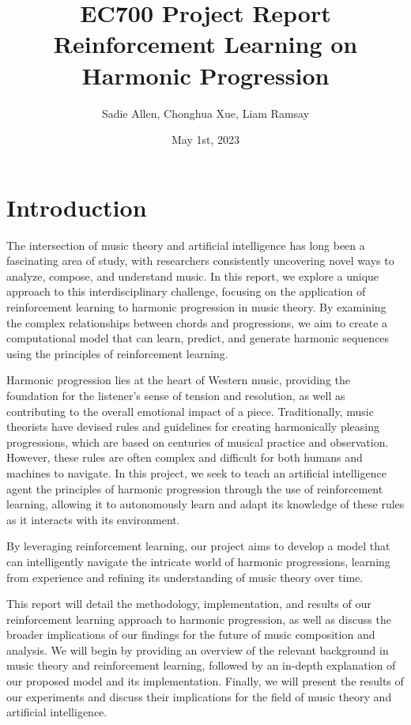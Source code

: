 \documentclass[12pt, letterpaper]{article}
\title{
    EC700 Project Report \\
    Reinforcement Learning on Harmonic Progression
}
\author{Sadie Allen, Chonghua Xue, Liam Ramsay}
\date{May 1st, 2023}
\begin{document}
\maketitle
\newpage

\section{Introduction}

The intersection of music theory and artificial intelligence has long been a fascinating area of study, with researchers consistently uncovering novel ways to analyze, compose, and understand music. In this report, we explore a unique approach to this interdisciplinary challenge, focusing on the application of reinforcement learning to harmonic progression in music theory. By examining the complex relationships between chords and progressions, we aim to create a computational model that can learn, predict, and generate harmonic sequences using the principles of reinforcement learning.

Harmonic progression lies at the heart of Western music, providing the foundation for the listener's sense of tension and resolution, as well as contributing to the overall emotional impact of a piece. Traditionally, music theorists have devised rules and guidelines for creating harmonically pleasing progressions, which are based on centuries of musical practice and observation. However, these rules are often complex and difficult for both humans and machines to navigate. In this project, we seek to teach an artificial intelligence agent the principles of harmonic progression through the use of reinforcement learning, allowing it to autonomously learn and adapt its knowledge of these rules as it interacts with its environment.

By leveraging reinforcement learning, our project aims to develop a model that can intelligently navigate the intricate world of harmonic progressions, learning from experience and refining its understanding of music theory over time.

This report will detail the methodology, implementation, and results of our reinforcement learning approach to harmonic progression, as well as discuss the broader implications of our findings for the future of music composition and analysis. We will begin by providing an overview of the relevant background in music theory and reinforcement learning, followed by an in-depth explanation of our proposed model and its implementation. Finally, we will present the results of our experiments and discuss their implications for the field of music theory and artificial intelligence.
\end{document}
